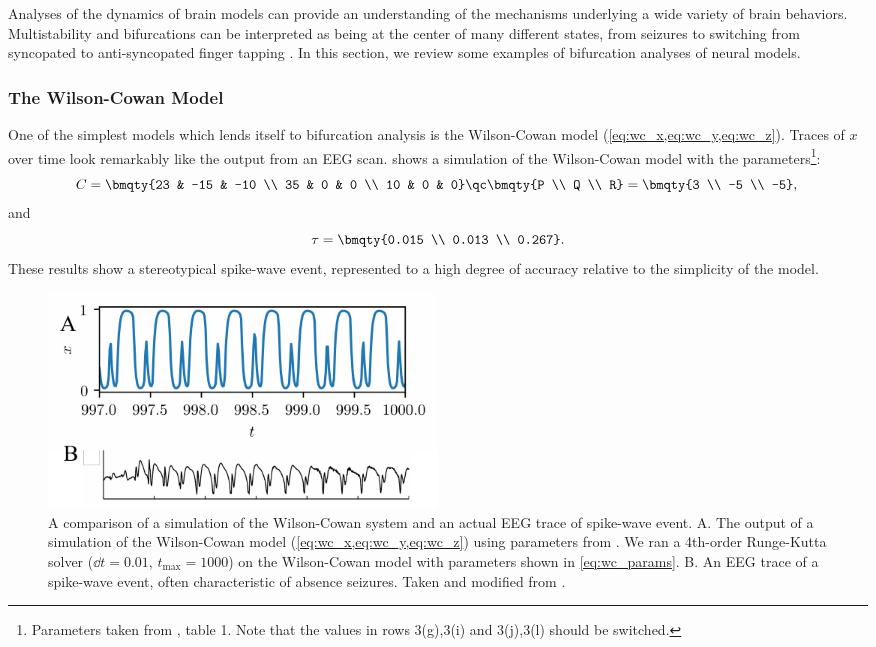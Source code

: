 Analyses of the dynamics of brain models can provide an understanding of the mechanisms underlying a wide variety of brain behaviors.
Multistability and bifurcations can be interpreted as being at the center of many different states, from seizures to switching from syncopated to anti-syncopated finger tapping \cite{Wang2012,Jirsa2014,Santos2017,Baier2012,Breakspear2005,Jirsa2014,Breakspear2017}.
In this section, we review some examples of bifurcation analyses of neural models.
\subsubsection{The Wilson-Cowan Model}
\label{sec:lit_review_bifurcation_wc}
One of the simplest models which lends itself to bifurcation analysis is the Wilson-Cowan model (\cref{eq:wc_x,eq:wc_y,eq:wc_z}).
Traces of $x$ over time look remarkably like the output from an EEG scan.
 shows a simulation of the Wilson-Cowan model with the parameters\footnote{Parameters taken from \cite{Wang2012}, table 1.  Note that the values in rows 3(g),3(i) and 3(j),3(l) should be switched.}:
\begin{equation*}
  \label{eq:wc_params}
  C
  =
  \bmqty{23 & -15 & -10 \\ 35 & 0 & 0 \\ 10 & 0 & 0}
  \qc
  \bmqty{P \\ Q \\ R}
  =
  \bmqty{3 \\ -5 \\ -5}, \\
\end{equation*}
and
\begin{equation}
  \tau
  =
  \bmqty{0.015 \\ 0.013 \\ 0.267}.
\end{equation}
These results show a stereotypical spike-wave event, represented to a high degree of accuracy relative to the simplicity of the model.
\begin{figure}[ht]
  \centering
  \includegraphics[width=0.5\textwidth]{figure/wc.pdf}
  \caption[Wilson-Cowan simulation and spike-wave event]{A comparison of a simulation of the Wilson-Cowan system and an actual EEG trace of spike-wave event.
    A. The output of a simulation of the Wilson-Cowan model (\cref{eq:wc_x,eq:wc_y,eq:wc_z}) using parameters from \cite{Wang2012}.
    We ran a 4th-order Runge-Kutta solver ($\dd{t} = 0.01$, $t_{\text{max}} = 1000$) on the Wilson-Cowan model with parameters shown in \cref{eq:wc_params}.
    B. An EEG trace of a spike-wave event, often characteristic of absence seizures.
    Taken and modified from \cite{Marten2009}.
  }
  \label{fig:wc_and_swe}
\end{figure}


